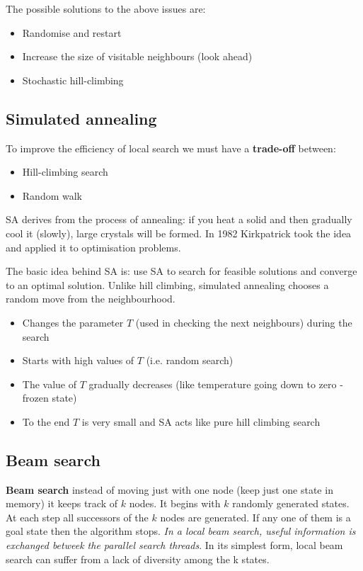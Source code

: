 \documentclass[a4paper, 11pt]{article}
\begin{document}
The possible solutions to the above issues are:
\begin{itemize}
  \item Randomise and restart
  \item Increase the size of visitable neighbours (look ahead)
  \item Stochastic hill-climbing
\end{itemize}

\subsection*{Simulated annealing}
To improve the efficiency of local search we must have a \textbf{trade-off} between:
\begin{itemize}
  \item Hill-climbing search
  \item Random walk
\end{itemize}

SA derives from the process of annealing: if you heat a solid and then gradually cool it (slowly), large crystals will be formed.
In 1982 Kirkpatrick took the idea and applied it to optimisation problems.

The basic idea behind SA is: use SA to search for feasible solutions and converge to an optimal solution.
Unlike hill climbing, simulated annealing chooses a random move from the neighbourhood.

\begin{itemize}
  \item Changes the parameter $T$ (used in checking the next neighbours) during the search
  \item Starts with high values of \( T \) (i.e. random search)
  \item The value of $T$ gradually decreases (like temperature going down to zero - frozen state)
  \item To the end $T$ is very small and SA acts like pure hill climbing search
\end{itemize}

\subsection*{Beam search}
\textbf{Beam search} instead of moving just with one node (keep just one state in memory) it keeps track of $k$ nodes. It begins with $k$ randomly generated states. At each step all successors of the $k$ nodes are generated. If any one of them is a goal state then the algorithm stops. \emph{In a local beam search, useful information is exchanged betweek the parallel search threads}.
In its simplest form, local beam search can suffer from a lack of diversity among the
k states.
\end{document}
